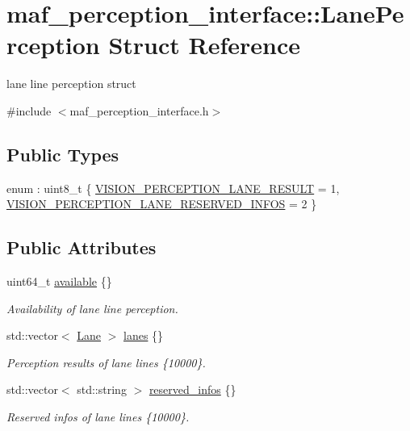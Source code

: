 \hypertarget{structmaf__perception__interface_1_1LanePerception}{}\section{maf\+\_\+perception\+\_\+interface\+:\+:Lane\+Perception Struct Reference}
\label{structmaf__perception__interface_1_1LanePerception}


lane line perception struct  




{\ttfamily \#include $<$maf\+\_\+perception\+\_\+interface.\+h$>$}

\subsection*{Public Types}
\begin{DoxyCompactItemize}
\item 
enum \+: uint8\+\_\+t \{ \hyperlink{structmaf__perception__interface_1_1LanePerception_a39d090ff9366cf355e5dcf4a2c32f5b7aec61c345ac2448cddc87ee468534e50b}{V\+I\+S\+I\+O\+N\+\_\+\+P\+E\+R\+C\+E\+P\+T\+I\+O\+N\+\_\+\+L\+A\+N\+E\+\_\+\+R\+E\+S\+U\+LT} = 1, 
\hyperlink{structmaf__perception__interface_1_1LanePerception_a39d090ff9366cf355e5dcf4a2c32f5b7ae207a5390a202bd6465fdd51a32e74ef}{V\+I\+S\+I\+O\+N\+\_\+\+P\+E\+R\+C\+E\+P\+T\+I\+O\+N\+\_\+\+L\+A\+N\+E\+\_\+\+R\+E\+S\+E\+R\+V\+E\+D\+\_\+\+I\+N\+F\+OS} = 2
 \}
\end{DoxyCompactItemize}
\subsection*{Public Attributes}
\begin{DoxyCompactItemize}
\item 
uint64\+\_\+t \hyperlink{structmaf__perception__interface_1_1LanePerception_a893260d34b31fca571bce1417770156d}{available} \{\}
\begin{DoxyCompactList}\small\item\em Availability of lane line perception. \end{DoxyCompactList}\item 
std\+::vector$<$ \hyperlink{structmaf__perception__interface_1_1Lane}{Lane} $>$ \hyperlink{structmaf__perception__interface_1_1LanePerception_a63802eaeaa0bcec7c25d01b716d44cea}{lanes} \{\}
\begin{DoxyCompactList}\small\item\em Perception results of lane lines \{10000\}. \end{DoxyCompactList}\item 
std\+::vector$<$ std\+::string $>$ \hyperlink{structmaf__perception__interface_1_1LanePerception_ad52bcf43c29fd16c56bbf88709df4605}{reserved\+\_\+infos} \{\}
\begin{DoxyCompactList}\small\item\em Reserved infos of lane lines \{10000\}. \end{DoxyCompactList}\end{DoxyCompactItemize}


